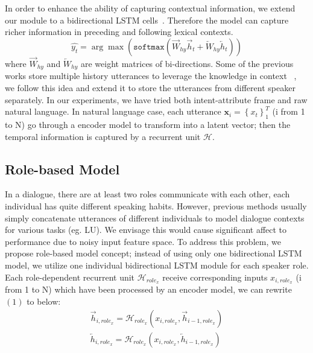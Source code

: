 \documentclass[11pt,letterpaper]{article}
\begin{document}
In order to enhance the ability of capturing contextual information, we extend our module to a bidirectional LSTM cells~\cite{schuster1997bidirectional}.
Therefore the model can capture richer information in preceding and following lexical contexts. 
\begin{equation}
\hat{y_t} = \arg\max (\mathtt{softmax}( \overrightarrow{W}_{hy}\overrightarrow{h}_t + \overleftarrow{W}_{hy}\overleftarrow{h}_t))
\end{equation}
where $\overrightarrow{W}_{hy}$ and $\overleftarrow{W}_{hy}$ are weight matrices of bi-directions.
Some of the previous works store multiple history utterances to leverage the knowledge in context ~\cite{chen2016end,yang2017end}, we follow this idea and extend it to store the utterances from different speaker separately.
In our experiments, we have tried both intent-attribute frame and raw natural language. In natural language case, each utterance $\mathbf{x}_i=\left\{ x_t\right\}^T_1$ (i from 1 to N) go through a encoder model to transform into a latent vector; then the temporal information is captured by a recurrent unit $\mathcal{H}$.

\subsection{Role-based Model}
\label{ssec:rolebasedmodel}
In a dialogue, there are at least two roles communicate with each other, each individual has quite different speaking habits. However, previous methods usually simply concatenate utterances of different individuals to model dialogue contexts for various tasks (eg. LU). We envisage this would cause significant affect to performance due to noisy input feature space. To address this problem, we propose role-based model concept; instead of using only one bidirectional LSTM model, we utilize one individual bidirectional LSTM module for each speaker role. Each role-dependent recurrent unit $\mathcal{H}_{role_x}$ receive corresponding inputs $x_{i,role_x}$ (i from 1 to N) which have been processed by an encoder model, we can rewrite $(1)$ to below:
\begin{gather*}
\overrightarrow{h}_{i,role_x} = \mathcal{H}_{role_x}(x_{i,role_x}, \overrightarrow{h}_{i-1, role_x}) \\ 
\overleftarrow{h}_{i, role_x} = \mathcal{H}_{role_x}(x_{i,role_x}, \overleftarrow{h}_{i-1, role_x})
\end{gather*}
\end{document}
